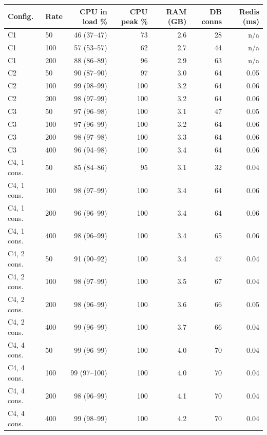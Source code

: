 \begin{tabular}{llrrrrr}
\toprule
Config. & Rate & CPU in load \% & CPU peak \% & RAM (GB) & DB conns & Redis (ms) \\
\midrule
C1 & 50 & 46 (37--47) & 73 & 2.6 & 28 & n/a \\
C1 & 100 & 57 (53--57) & 62 & 2.7 & 44 & n/a \\
C1 & 200 & 88 (86--89) & 96 & 2.9 & 63 & n/a \\
\addlinespace[2pt]
C2 & 50 & 90 (87--90) & 97 & 3.0 & 64 & 0.05 \\
C2 & 100 & 99 (98--99) & 100 & 3.2 & 64 & 0.06 \\
C2 & 200 & 98 (97--99) & 100 & 3.2 & 64 & 0.06 \\
\addlinespace[2pt]
C3 & 50 & 97 (96--98) & 100 & 3.1 & 47 & 0.05 \\
C3 & 100 & 97 (96--99) & 100 & 3.2 & 64 & 0.06 \\
C3 & 200 & 98 (97--98) & 100 & 3.3 & 64 & 0.06 \\
C3 & 400 & 96 (94--98) & 100 & 3.4 & 64 & 0.06 \\
\addlinespace[2pt]
C4, 1 cons. & 50 & 85 (84--86) & 95 & 3.1 & 32 & 0.04 \\
C4, 1 cons. & 100 & 98 (97--99) & 100 & 3.4 & 64 & 0.06 \\
C4, 1 cons. & 200 & 96 (96--99) & 100 & 3.4 & 64 & 0.06 \\
C4, 1 cons. & 400 & 98 (96--99) & 100 & 3.4 & 65 & 0.06 \\
\addlinespace[2pt]
C4, 2 cons. & 50 & 91 (90--92) & 100 & 3.4 & 47 & 0.04 \\
C4, 2 cons. & 100 & 98 (97--99) & 100 & 3.5 & 67 & 0.04 \\
C4, 2 cons. & 200 & 98 (96--99) & 100 & 3.6 & 66 & 0.05 \\
C4, 2 cons. & 400 & 99 (96--99) & 100 & 3.7 & 66 & 0.04 \\
\addlinespace[2pt]
C4, 4 cons. & 50 & 99 (96--99) & 100 & 4.0 & 70 & 0.04 \\
C4, 4 cons. & 100 & 99 (97--100) & 100 & 4.0 & 70 & 0.04 \\
C4, 4 cons. & 200 & 98 (96--99) & 100 & 4.1 & 70 & 0.04 \\
C4, 4 cons. & 400 & 99 (98--99) & 100 & 4.2 & 70 & 0.04 \\
\bottomrule
\end{tabular}
